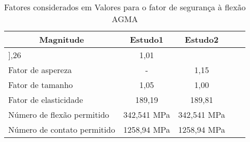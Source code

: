 \begin{table}[]
\centering
\caption{\label{tab:9} Fatores considerados em Valores para o fator de segurança à flexão AGMA}
\begin{tabular}{l c c c c}
\hline
\multicolumn{1}{c}{\textbf{Magnitude}} & \textbf{Estudo1} & \textbf{Estudo2} \\ \hline
],26              & 1,01              \\
Fator de aspereza                      & -                 & 1,15              \\
Fator de tamanho                       & 1,05              & 1,00              \\
Fator de elasticidade                  & 189,19            & 189,81            \\
Número de flexão permitido             & 342,541 MPa       & 342,541 MPa       \\
Número de contato permitido            & 1258,94 MPa       & 1258,94 MPa   \\ \hline  
\end{tabular}
\end{table}